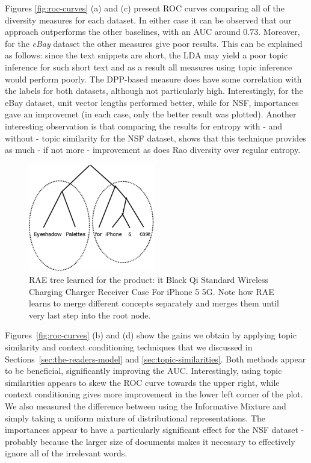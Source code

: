 Figures \ref{fig:roc-curves} (a) and (c)
present ROC curves comparing all of the diversity measures for each dataset.
In either case it can be observed
that our approach outperforms the other baselines, with an AUC
around $0.73$. Moreover, for the {\em eBay} dataset the other measures
give poor results. This can be explained as follows: since the
text snippets are short, the LDA may yield a poor topic inference for
such short text and as a result all measures using topic inference
would perform poorly. The DPP-based measure does have some correlation
with the labels for both datasets, although not particularly
high. Interestingly, for the eBay dataset, unit vector lengths
performed better, while for NSF, importances gave an improvemet (in
each case, only the better result was
plotted). Another interesting observation is that comparing the
results for entropy with - and without - topic similarity for the NSF
dataset, shows that this technique provides as much - if not more -
improvement as does Rao diversity over regular entropy.
\begin{figure}
\begin{center}
\includegraphics[width=5.5cm]{figures/RAE.png}
\caption{RAE tree learned for the product: {it Black Qi Standard Wireless Charging Charger Receiver Case For iPhone 5 5G}. Note how RAE learns to merge different concepts separately and merges them until very last step into the root node.}
\end{center}
\label{fig:rae-example}
\end{figure}

Figures~\ref{fig:roc-curves} (b) and (d)  
show the gains we obtain by applying topic
similarity and context conditioning techniques that we
discussed in Sections~\ref{sec:the-readers-model} and
\ref{sec:topic-similarities}. Both methods appear to be beneficial,
significantly improving the AUC. Interestingly, using
topic similarities appears to skew the ROC curve towards the upper
right, while context conditioning gives more improvement in the lower
left corner of the plot. We also measured the difference between using 
the Informative Mixture and simply taking a uniform mixture of
distributional representations. The importances appear to have a
particularly significant effect for the NSF dataset - probably because
the larger size of documents makes it necessary to effectively ignore all of
the irrelevant words.

